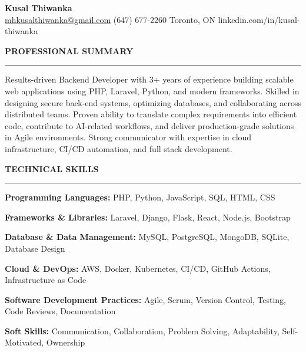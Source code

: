 \documentclass[10pt,letterpaper]{article}
\begin{document}
\begin{center}
{\LARGE\textbf{Kusal Thiwanka}}\\[3pt]
\href{mailto:mhkusalthiwanka@gmail.com}{mhkusalthiwanka@gmail.com}\hspace{2em}%
(647) 677{-}2260\hspace{2em}%
Toronto, ON\hspace{2em}
linkedin.com/in/kusal-thiwanka
\end{center}

\vspace{6pt}

\textbf{PROFESSIONAL SUMMARY}\\[-8pt]
\noindent\rule{\textwidth}{1pt}

\vspace{-2pt}

Results-driven Backend Developer with 3+ years of experience building scalable web applications using PHP, Laravel, Python, and modern frameworks. Skilled in designing secure back-end systems, optimizing databases, and collaborating across distributed teams. Proven ability to translate complex requirements into efficient code, contribute to AI-related workflows, and deliver production-grade solutions in Agile environments. Strong communicator with expertise in cloud infrastructure, CI/CD automation, and full stack development.

\vspace{8pt}

\textbf{TECHNICAL SKILLS}\\[-8pt]
\noindent\rule{\textwidth}{1pt}

\vspace{-2pt}

\textbf{Programming Languages:} PHP, Python, JavaScript, SQL, HTML, CSS

\textbf{Frameworks \& Libraries:} Laravel, Django, Flask, React, Node.js, Bootstrap

\textbf{Database \& Data Management:} MySQL, PostgreSQL, MongoDB, SQLite, Database Design

\textbf{Cloud \& DevOps:} AWS, Docker, Kubernetes, CI/CD, GitHub Actions, Infrastructure as Code

\textbf{Software Development Practices:} Agile, Scrum, Version Control, Testing, Code Reviews, Documentation

\textbf{Soft Skills:} Communication, Collaboration, Problem Solving, Adaptability, Self-Motivated, Ownership

\vspace{8pt}
\end{document}
